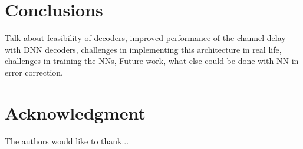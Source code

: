 \documentclass[conference]{IEEEtran}
\begin{document}
\section{Conclusions}

Talk about feasibility of decoders, improved performance of the channel delay with DNN decoders, challenges in implementing this architecture in real life, challenges in training the NNs, Future work, what else could be done with NN in error correction, 

\section*{Acknowledgment}
The authors would like to thank...


\cite{Shannon:2001:MTC:584091.584093, DBLP:journals/corr/CalabreseWGPS16, DBLP:journals/corr/OSheaH17, 2016arXiv160806409O, 2017arXiv171008379G, Worm00turbo-decodingwithout, Viterbi, journals/ett/RobertsonHV97, HagenauerJ, JordanMA,Ibnkahla, nielsenneural, murphy2013machine, DBLP:journals/corr/AbadiABBCCCDDDG16, chollet2015keras, doi:10.1162/neco.2006.18.7.1527, DBLP:conf/acssc/BenammarP18, DBLP:journals/corr/KeskarMNST16}









\end{document}
